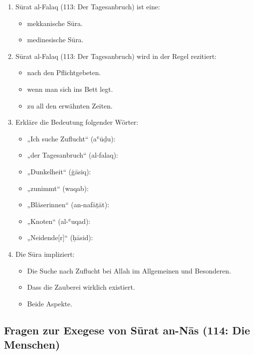 \begin{enumerate}[leftmargin=1.6em,resume]
\item Sūrat al-Falaq (113: Der Tagesanbruch) ist eine:
  \begin{itemize}
    \item mekkanische Sūra. \item medinesische Sūra.
  \end{itemize}
\item Sūrat al-Falaq (113: Der Tagesanbruch) wird in der Regel rezitiert:
  \begin{itemize}
    \item nach den Pflichtgebeten. \item wenn man sich ins Bett legt.
    \item zu all den erwähnten Zeiten.
  \end{itemize}
\item Erkläre die Bedeutung folgender Wörter:
  \begin{itemize}
    \item „Ich suche Zuflucht“ (aʿūḏu): \dotfill
    \item „der Tagesanbruch“ (al-falaq): \dotfill
    \item „Dunkelheit“ (ġāsiq): \dotfill
    \item „zunimmt“ (waqab): \dotfill
    \item „Bläserinnen“ (an-nafāṯāt): \dotfill
    \item „Knoten“ (al-ʿuqad): \dotfill
    \item „Neidende[r]“ (ḥāsid): \dotfill
  \end{itemize}
\item Die Sūra impliziert:
  \begin{itemize}
    \item Die Suche nach Zuflucht bei Allah im Allgemeinen und Besonderen.
    \item Dass die Zauberei wirklich existiert.
    \item Beide Aspekte.
  \end{itemize}
\end{enumerate}

\subsection*{Fragen zur Exegese von Sūrat an-Nās (114: Die Menschen)}

